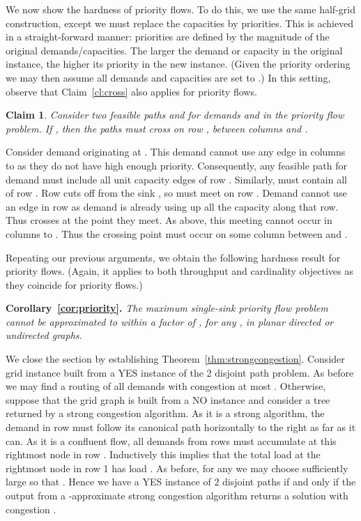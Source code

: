 \documentclass[12pt]{article}
\newtheorem{claim}{Claim}[section]
\newcommand{\qed}{}
\begin{document}
We now show the hardness of priority flows. To do this,
we use the same half-grid construction, except we must replace the
capacities by priorities. This is achieved in a straight-forward manner:
priorities are defined by the magnitude of the original demands/capacities.
The larger the demand or capacity in the original instance, the higher its priority in the
new instance. (Given the priority ordering we may then assume all demands and
capacities are set to .)
In this setting, observe that Claim~\ref{cl:cross} also applies for priority flows.
\begin{claim}
Consider  two feasible paths  and  for demands  and  in the priority flow problem.
If , then the paths must cross on row , between columns  and .
\end{claim}
Consider demand  originating at . This demand cannot
use any edge in columns  to  as they do not have high enough priority.
Consequently, any feasible path  for demand  must include all unit capacity edges  of row .
Similarly,  must contain all of row . Row  cuts off  from the sink , so
 must meet  on row .
Demand  cannot use an edge in row  as demand  is already using up all the capacity along that row.
Thus  crosses  at the point they meet. As above, this meeting cannot occur
in columns  to . Thus the crossing point must occur on some column between  and .
\qed

Repeating our previous arguments, we obtain the following hardness result for priority flows.
(Again, it applies to both throughput and cardinality objectives as they coincide for priority flows.)

{{\noindent\bf Corollary~\ref{cor:priority}.} \itshape
The maximum single-sink priority flow problem
cannot be approximated to within a factor of , for any , in planar
directed or undirected graphs. \qed
}

\vspace*{.2cm}
We close the section by establishing   Theorem~\ref{thm:strongcongestion}. Consider  grid instance  built from
 a YES instance of the 2 disjoint path problem. As before we may find a routing of all demands with  congestion at most .
Otherwise, suppose that the grid graph is built from  a NO instance and consider a tree  returned by a strong congestion algorithm.
As it is a strong algorithm, the demand in row  must follow its canonical path horizontally to the right as far as it can.
As it is a confluent flow, all demands from rows  must accumulate at this rightmost node in row .
Inductively this implies that the total load at the rightmost node in row 1 has load .
As before, for any  we may choose  sufficiently large so that . Hence
we have a YES instance of 2 disjoint paths if and only if the output from a -approximate strong congestion algorithm
returns a solution with congestion .
\end{document}
